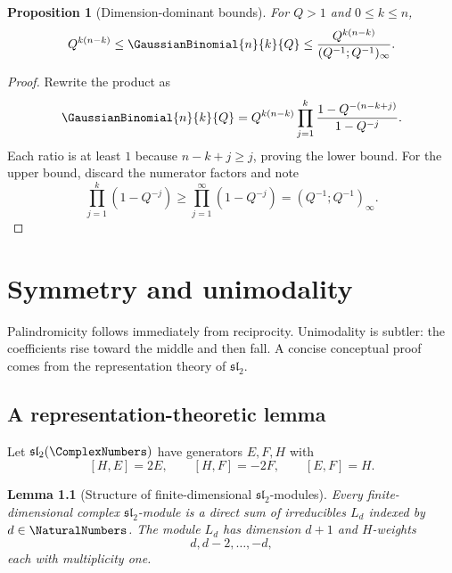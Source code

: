 \documentclass[11pt,a4paper,oneside,openany]{book}
\newtheorem{lemma}[lemma]{Lemma}
\newtheorem{proposition}[proposition]{Proposition}
\theoremstyle{definition}
\theoremstyle{remark}
\begin{document}
\begin{proposition}[Dimension-dominant bounds]\label{prop:qbinom-growth}
For $Q>1$ and $0\le k\le n$,
\[
 Q^{k(n-k)}
 \le \GaussianBinomial{n}{k}{Q}
 \le \frac{Q^{k(n-k)}}{(Q^{-1};Q^{-1})_\infty}.
\]
\end{proposition}

\begin{proof}
Rewrite the product as
\[
 \GaussianBinomial{n}{k}{Q}
 =Q^{k(n-k)}
 \prod_{j=1}^{k}\frac{1-Q^{-(n-k+j)}}{1-Q^{-j}}.
\]
Each ratio is at least $1$ because $n-k+j\ge j$, proving the lower bound.  For the upper bound, discard the numerator factors and note
\[
 \prod_{j=1}^{k}(1-Q^{-j})\ge\prod_{j=1}^{\infty}(1-Q^{-j})=(Q^{-1};Q^{-1})_\infty.
\]
\end{proof}

\chapter{Symmetry and unimodality}\label{chap:unimodality}

Palindromicity follows immediately from reciprocity.  Unimodality is subtler: the coefficients rise toward the middle and then fall.  A concise conceptual proof comes from the representation theory of $\mathfrak{sl}_2$.

\section{A representation-theoretic lemma}

Let $\mathfrak{sl}_2(\ComplexNumbers)$ have generators $E,F,H$ with
\[
 [H,E]=2E,\qquad [H,F]=-2F,\qquad [E,F]=H.
\]

\begin{lemma}[Structure of finite-dimensional $\mathfrak{sl}_2$-modules]\label{lem:sl2-structure}
Every finite-dimensional complex $\mathfrak{sl}_2$-module is a direct sum of irreducibles $L_d$ indexed by $d\in\NaturalNumbers$.  The module $L_d$ has dimension $d+1$ and $H$-weights
\[
 d,d-2,\dots,-d,
\]
each with multiplicity one.
\end{lemma}
\end{document}

